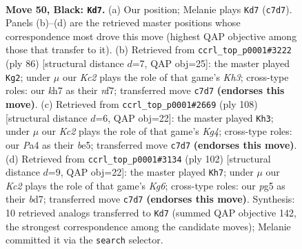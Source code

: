 \documentclass[11pt]{article}
\begin{document}
\clearpage

\begin{figure}[p]\centering
\begin{subfigure}{0.46\textwidth}\centering
\resizebox{\linewidth}{!}{%
\newchessgame
\chessboard[
  setfen={8/2k4K/6p1/6P1/p7/3b4/8/6b1 b - - 7 50},
  showmover=false,
  pgfstyle=straightmove, color=movearrow, markmove={c7-d7}
]}
\caption{}
\end{subfigure}\hfill
\begin{subfigure}{0.46\textwidth}\centering
\resizebox{\linewidth}{!}{%
\newchessgame
\chessboard[
  setfen={8/p4n1k/7P/8/8/7K/P7/2B5 w - - 1 44},
  showmover=false,
  pgfstyle=straightmove, color=movearrow, markmove={h3-g2}
]}
\caption{}
\end{subfigure}
\\[4pt]
\begin{subfigure}{0.46\textwidth}\centering
\resizebox{\linewidth}{!}{%
\newchessgame
\chessboard[
  setfen={8/8/8/2kPb3/p5K1/8/B7/8 w - - 5 55},
  showmover=false,
  pgfstyle=straightmove, color=movearrow, markmove={g4-h3}
]}
\caption{}
\end{subfigure}\hfill
\begin{subfigure}{0.46\textwidth}\centering
\resizebox{\linewidth}{!}{%
\newchessgame
\chessboard[
  setfen={8/3b4/3P2K1/1p1k4/1B6/8/8/8 w - - 2 52},
  showmover=false,
  pgfstyle=straightmove, color=movearrow, markmove={g6-h7}
]}
\caption{}
\end{subfigure}
\caption{\textbf{Move 50, Black: \texttt{Kd7}.} (a) Our position; Melanie plays \texttt{Kd7} (\texttt{c7d7}). Panels (b)--(d) are the retrieved master positions whose correspondence most drove this move (highest QAP objective among those that transfer to it). (b) Retrieved from \texttt{ccrl\_top\_p0001\#3222} (ply 86) [structural distance $d$=7, QAP obj=25]: the master played \texttt{Kg2}; under $\mu$ our \emph{Kc2} plays the role of that game's \emph{Kh3}; cross-type roles: our \emph{k}h7 as their \emph{n}f7; transferred move \texttt{c7d7} \textbf{(endorses this move)}. (c) Retrieved from \texttt{ccrl\_top\_p0001\#2669} (ply 108) [structural distance $d$=6, QAP obj=22]: the master played \texttt{Kh3}; under $\mu$ our \emph{Kc2} plays the role of that game's \emph{Kg4}; cross-type roles: our \emph{P}a4 as their \emph{b}e5; transferred move \texttt{c7d7} \textbf{(endorses this move)}. (d) Retrieved from \texttt{ccrl\_top\_p0001\#3134} (ply 102) [structural distance $d$=9, QAP obj=22]: the master played \texttt{Kh7}; under $\mu$ our \emph{Kc2} plays the role of that game's \emph{Kg6}; cross-type roles: our \emph{p}g5 as their \emph{b}d7; transferred move \texttt{c7d7} \textbf{(endorses this move)}. Synthesis: 10 retrieved analogs transferred to \texttt{Kd7} (summed QAP objective 142, the strongest correspondence among the candidate moves); Melanie committed it via the \texttt{search} selector.}
\label{fig:thought-m99}
\end{figure}
\end{document}
